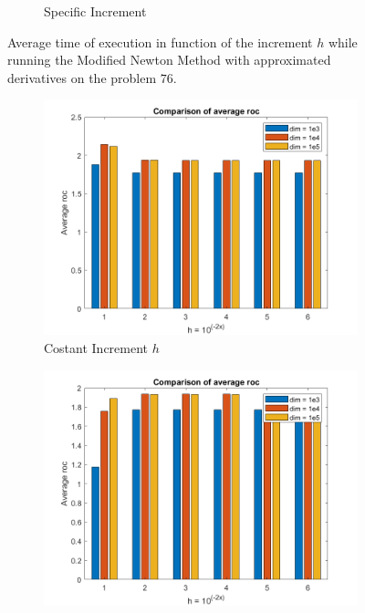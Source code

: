 \begin{figure}[htbp]
\begin{subfigure}[t]{0.45\textwidth}
        \caption{Specific Increment }
    \end{subfigure}
    \caption{ \small Average time of execution in function of the increment $h$  while running the Modified Newton Method with approximated derivatives on the problem $76$.}
\end{figure}


\begin{figure}[htbp]
    \centering
    \begin{subfigure}[t]{0.45\textwidth}  %
        \centering
        \includegraphics[width=\textwidth]{img/pb76_MN_difffinite_COST_rateofconv.png}
        \caption{Costant Increment $h$}
    \end{subfigure}
    \hspace{1cm} %
    \begin{subfigure}[t]{0.45\textwidth}
        \centering
        \includegraphics[width=\textwidth]{img/pb76_MN_difffinite_REL_rateofconv.png}

\end{subfigure}
\end{figure}
